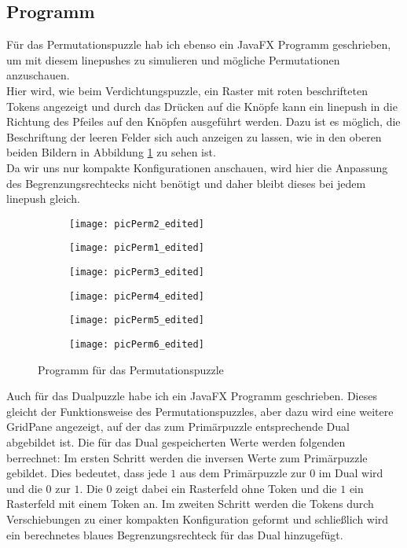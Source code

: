 \documentclass[seminar,german]{algothesis}
\begin{document}
\subsection{Programm}
Für das Permutationspuzzle hab ich ebenso ein JavaFX Programm geschrieben, um mit diesem linepushes zu simulieren und mögliche Permutationen anzuschauen.\\
Hier wird, wie beim Verdichtungspuzzle, ein Raster mit roten beschrifteten Tokens angezeigt und durch das Drücken auf die Knöpfe kann ein linepush in die Richtung des Pfeiles auf den Knöpfen ausgeführt werden. Dazu ist es möglich, die Beschriftung der leeren Felder sich auch anzeigen zu lassen, wie in den oberen beiden Bildern in Abbildung \ref{fig:14} zu sehen ist.\\
 Da wir uns nur kompakte Konfigurationen anschauen, wird hier die Anpassung des Begrenzungsrechtecks nicht benötigt und daher bleibt dieses bei jedem linepush gleich.
\begin{figure}[ht]
	\centering
	\begin{subfigure}{.4\textwidth}
		\texttt{[image: picPerm2\_edited]}
    \end{subfigure}%
    \begin{subfigure}{.4\textwidth}
		\texttt{[image: picPerm1\_edited]}
    \end{subfigure}
\end{figure}
\begin{figure}[ht]
	\centering
	\begin{subfigure}{.4\textwidth}
		\texttt{[image: picPerm3\_edited]}
    \end{subfigure}%
    \begin{subfigure}{.4\textwidth}
		\texttt{[image: picPerm4\_edited]}
    \end{subfigure}
\end{figure}
\begin{figure}[ht]
	\centering
	\begin{subfigure}{.4\textwidth}
		\texttt{[image: picPerm5\_edited]}
    \end{subfigure}%
    \begin{subfigure}{.4\textwidth}
		\texttt{[image: picPerm6\_edited]}
    \end{subfigure}
    \caption{Programm für das Permutationspuzzle}
	\label{fig:14}
\end{figure}
\newpage
\noindent Auch für das Dualpuzzle habe ich ein JavaFX Programm geschrieben. Dieses gleicht der Funktionsweise des Permutationspuzzles, aber dazu wird eine weitere GridPane angezeigt, auf der das zum Primärpuzzle entsprechende Dual abgebildet ist. Die für das Dual gespeicherten Werte werden folgenden berrechnet: Im ersten Schritt werden die inversen Werte zum Primärpuzzle gebildet. Dies bedeutet, dass jede \glqq$1$\grqq{}  aus dem Primärpuzzle zur \glqq$0$\grqq{} im Dual wird und die \glqq$0$\grqq{} zur \glqq$1$\grqq{}. Die \glqq$0$\grqq{} zeigt dabei ein Rasterfeld ohne Token und die \glqq$1$\grqq{} ein Rasterfeld mit einem Token an. Im zweiten Schritt werden die Tokens durch Verschiebungen zu einer kompakten Konfiguration geformt und schließlich wird ein berechnetes blaues Begrenzungsrechteck für das Dual hinzugefügt.
\end{document}
